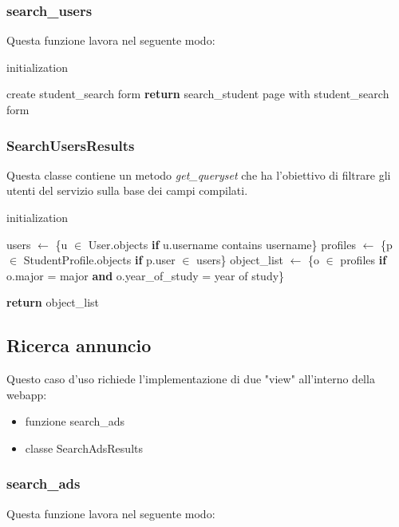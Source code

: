 \documentclass[10pt,a4paper]{report}
\begin{document}
	\subsubsection{search\_users}
	Questa funzione lavora nel seguente modo:\\
	
	\begin{algorithm}[H]
		initialization\;
		
		create student\_search form\;
		\textbf{return} search\_student page with student\_search form\; 
	\end{algorithm}

	\subsubsection{SearchUsersResults}
	
	Questa classe contiene un metodo \textit{get\_queryset} che ha l'obiettivo di filtrare gli utenti del servizio sulla base dei campi compilati. \\
	
	\begin{algorithm}[H]
		initialization\;
		
		users $\gets$ \{u $\in$ User.objects \textbf{if} u.username contains username\}\;
		profiles $\gets$ \{p $\in$ StudentProfile.objects \textbf{if} p.user $\in$ users\}\;
		object\_list $\gets$ \{o $\in$ profiles \textbf{if} o.major = major \textbf{and} o.year\_of\_study = year of study\}\;
		
		\textbf{return} object\_list\;
		
	\end{algorithm}

	\subsection{Ricerca annuncio}
	Questo caso d'uso richiede l'implementazione di due "view" all'interno della webapp:
	\begin{itemize}
		\item funzione search\_ads
		\item classe SearchAdsResults
	\end{itemize}

	\subsubsection{search\_ads}
	Questa funzione lavora nel seguente modo:\\
	
\end{document}
